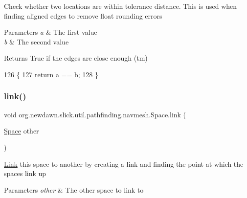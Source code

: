 Check whether two locations are within tolerance distance. This is used when finding aligned edges to remove float rounding errors


\begin{DoxyParams}{Parameters}
{\em a} & The first value \\
\hline
{\em b} & The second value \\
\hline
\end{DoxyParams}
\begin{DoxyReturn}{Returns}
True if the edges are close enough (tm) 
\end{DoxyReturn}

\begin{DoxyCode}
126                                                   \{
127         \textcolor{keywordflow}{return} a == b;
128     \}
\end{DoxyCode}
\mbox{\label{classorg_1_1newdawn_1_1slick_1_1util_1_1pathfinding_1_1navmesh_1_1_space_aef276d96a286583f4d5bdb55a051ddb5}} 
\subsubsection{\texorpdfstring{link()}{link()}}
{\footnotesize\ttfamily void org.\+newdawn.\+slick.\+util.\+pathfinding.\+navmesh.\+Space.\+link (\begin{DoxyParamCaption}\item[{\mbox{\hyperlink{classorg_1_1newdawn_1_1slick_1_1util_1_1pathfinding_1_1navmesh_1_1_space}{Space}}}]{other }\end{DoxyParamCaption})\hspace{0.3cm}{\ttfamily [inline]}}

\mbox{\hyperlink{classorg_1_1newdawn_1_1slick_1_1util_1_1pathfinding_1_1navmesh_1_1_link}{Link}} this space to another by creating a link and finding the point at which the spaces link up


\begin{DoxyParams}{Parameters}
{\em other} & The other space to link to \\
\hline
\end{DoxyParams}

